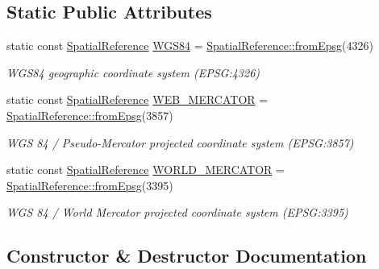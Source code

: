 \subsection*{Static Public Attributes}
\begin{DoxyCompactItemize}
\item 
static const \hyperlink{classdg_1_1deepcore_1_1geometry_1_1_spatial_reference}{Spatial\+Reference} \hyperlink{group___imagery_module_gaec91c35670e3d08a4113cea23f7f9ed8}{W\+G\+S84} = \hyperlink{group___imagery_module_ga4ef6ea29f2717ed5572522fe50b23d99}{Spatial\+Reference\+::from\+Epsg}(4326)
\begin{DoxyCompactList}\small\item\em W\+G\+S84 geographic coordinate system (E\+P\+SG\+:4326) \end{DoxyCompactList}\item 
static const \hyperlink{classdg_1_1deepcore_1_1geometry_1_1_spatial_reference}{Spatial\+Reference} \hyperlink{group___imagery_module_ga91bb1b661e9fc39639771e80c1fc98e4}{W\+E\+B\+\_\+\+M\+E\+R\+C\+A\+T\+OR} = \hyperlink{group___imagery_module_ga4ef6ea29f2717ed5572522fe50b23d99}{Spatial\+Reference\+::from\+Epsg}(3857)
\begin{DoxyCompactList}\small\item\em W\+GS 84 / Pseudo-\/\+Mercator projected coordinate system (E\+P\+SG\+:3857) \end{DoxyCompactList}\item 
static const \hyperlink{classdg_1_1deepcore_1_1geometry_1_1_spatial_reference}{Spatial\+Reference} \hyperlink{group___imagery_module_ga07533c6dcdfd100538307ceef2152f24}{W\+O\+R\+L\+D\+\_\+\+M\+E\+R\+C\+A\+T\+OR} = \hyperlink{group___imagery_module_ga4ef6ea29f2717ed5572522fe50b23d99}{Spatial\+Reference\+::from\+Epsg}(3395)
\begin{DoxyCompactList}\small\item\em W\+GS 84 / World Mercator projected coordinate system (E\+P\+SG\+:3395) \end{DoxyCompactList}\end{DoxyCompactItemize}


\subsection{Constructor \& Destructor Documentation}
